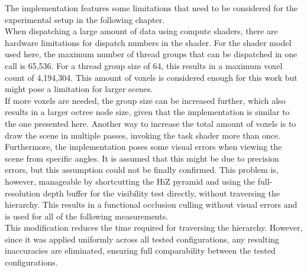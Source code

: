 The implementation features some limitations that need to be considered for the experimental setup 
in the following chapter.\\

\noindent
When dispatching a large amount of data using compute shaders, there are hardware limitations for 
dispatch numbers in the shader. For the shader model used here, the maximum number of thread groups 
that can be dispatched in one call is 65,536. For a thread group size of 64, this results in a 
maximum voxel count of 4,194,304. This amount of voxels is considered enough for this work but 
might pose a limitation for larger scenes. \\

\noindent
If more voxels are needed, the group size can be increased further, which also results in a larger 
octree node size, given that the implementation is similar to the one presented here. Another way 
to increase the total amount of voxels is to draw the scene in multiple passes, invoking the task 
shader more than once.\\

\noindent
Furthermore, the implementation poses some visual errors when viewing the scene from specific 
angles. It is assumed that this might be due to precision errors, but this assumption could not 
be finally confirmed. This problem is, however, manageable by shortcutting the \ac{HiZ} pyramid 
and using the full-resolution depth buffer for the visibility test directly, without traversing 
the hierarchy. This results in a functional occlusion culling without visual errors and is used 
for all of the following measurements. \\

\noindent
This modification reduces the time required for traversing the hierarchy. However, since it was 
applied uniformly across all tested configurations, any resulting inaccuracies are eliminated, 
ensuring full comparability between the tested configurations. 
